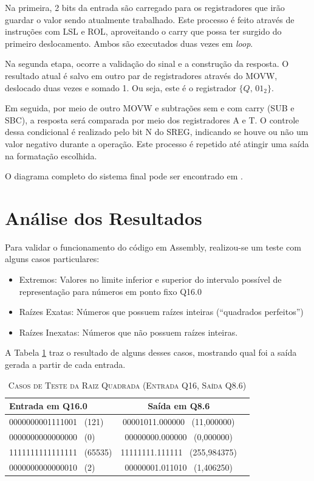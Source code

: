 \documentclass[conference]{IEEEtran}
\begin{document}
Na primeira, 2 bits da entrada são carregado para os registradores que irão guardar o valor sendo atualmente trabalhado. Este processo é feito através de instruções com LSL e ROL, aproveitando o carry que possa ter surgido do primeiro deslocamento. Ambos são executados duas vezes em \textit{loop}. 

Na segunda etapa, ocorre a validação do sinal e a construção da resposta. O resultado atual é salvo em outro par de registradores através do MOVW, deslocado duas vezes e somado 1. Ou seja, este é o registrador $\{Q,\,01_2\}$. 

Em seguida, por meio de outro MOVW e subtrações sem e com carry (SUB e SBC), a resposta será comparada por meio dos registradores A e T. O controle dessa condicional é realizado pelo bit N do SREG, indicando se houve ou não um valor negativo durante a operação. Este processo é repetido até atingir uma saída na formatação escolhida. 

O diagrama completo do sistema final pode ser encontrado em \cite{monteiro_sismicro}.

\newpage
\section{Análise dos Resultados}
Para validar o funcionamento do código em Assembly, realizou-se um teste com alguns casos particulares:
\begin{itemize}
    \item Extremos: Valores no limite inferior e superior do intervalo possível de representação para números em ponto fixo Q16.0
    \item Raízes Exatas: Números que possuem raízes inteiras (``quadrados perfeitos'')
    \item Raízes Inexatas: Números que não possuem raízes inteiras.
\end{itemize}

A Tabela \ref{tabela_teste} traz o resultado de alguns desses casos, mostrando qual foi a saída gerada a partir de cada entrada.

\begin{table}[htbp]
\centering
\caption{\textsc{Casos de Teste da Raiz Quadrada (Entrada Q16, Saída Q8.6)}}
\label{tabela_teste}
\begin{tabular}{lcc}
\hline
\textbf{Entrada em Q16.0} & \textbf{Saída em Q8.6} \\
\hline
0000000001111001 \ (121)   & 00001011.000000 \ (11{,}000000) \\
0000000000000000 \ (0)     & 00000000.000000 \ (0{,}000000) \\
1111111111111111 \ (65535) & 11111111.111111 \ (255{,}984375) \\
0000000000000010 \ (2)     & 00000001.011010 \ (1{,}406250) \\
\hline
\end{tabular}
\end{table}
\end{document}
